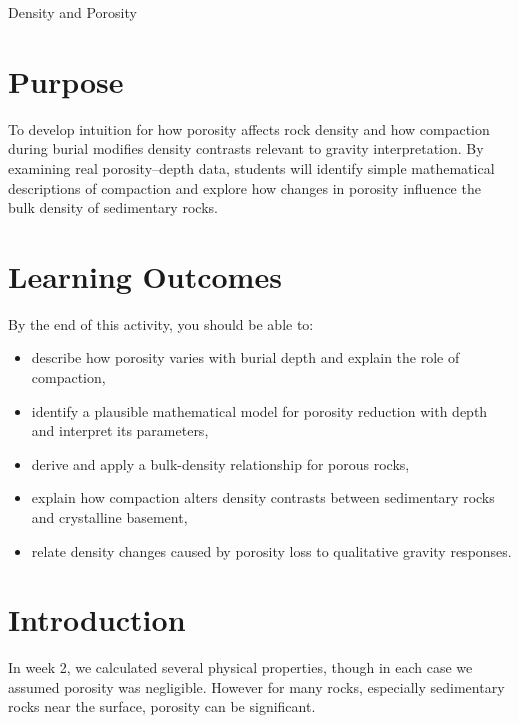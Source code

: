 \begin{activity}{Density and Porosity}

\section*{Purpose}
To develop intuition for how porosity affects rock density and how compaction during burial modifies density contrasts relevant to gravity interpretation. By examining real porosity--depth data, students will identify simple mathematical descriptions of compaction and explore how changes in porosity influence the bulk density of sedimentary rocks.

\section*{Learning Outcomes}

By the end of this activity, you should be able to:
\begin{itemize}
  \item describe how porosity varies with burial depth and explain the role of compaction,
  \item identify a plausible mathematical model for porosity reduction with depth and interpret its parameters,
  \item derive and apply a bulk-density relationship for porous rocks,
  \item explain how compaction alters density contrasts between sedimentary rocks and crystalline basement,
  \item relate density changes caused by porosity loss to qualitative gravity responses.
\end{itemize}

\section*{Introduction}
In week 2, we calculated several physical properties, though in each case we assumed porosity was negligible. However for many rocks, especially sedimentary rocks near the surface, porosity can be significant.


\end{activity}
